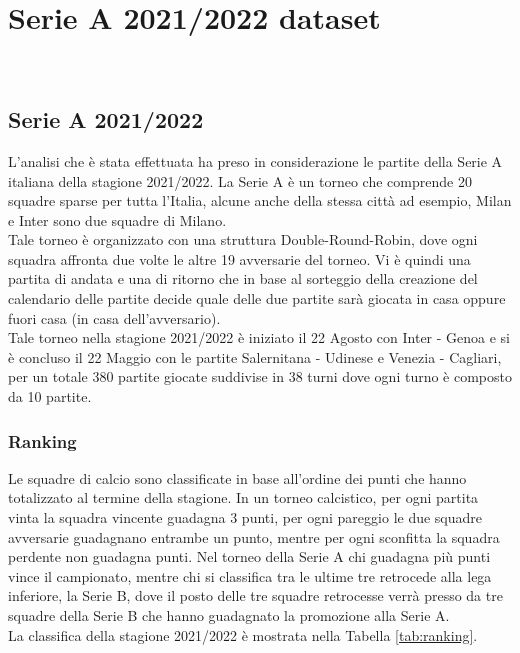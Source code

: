 
\chapter{Serie A 2021/2022 dataset }

\\

\section{Serie A 2021/2022}

L'analisi che è stata effettuata ha preso in considerazione le partite della Serie A italiana della stagione 2021/2022. La Serie A è un torneo che comprende 20 squadre sparse per tutta l'Italia, alcune anche della stessa città ad esempio, Milan e Inter sono due squadre di Milano. \\
Tale torneo è organizzato con una struttura Double-Round-Robin, dove ogni squadra affronta due volte le altre 19 avversarie del torneo. Vi è quindi una partita di andata e una di ritorno che in base al sorteggio della creazione del calendario delle partite decide quale delle due partite sarà giocata in casa oppure fuori casa (in casa dell'avversario). \\
Tale torneo nella stagione 2021/2022 è iniziato il 22 Agosto con Inter - Genoa e si è concluso il 22 Maggio con le partite Salernitana - Udinese e Venezia - Cagliari, per un totale 380 partite giocate suddivise in 38 turni dove ogni turno è composto da 10 partite.

\subsection{Ranking}
Le squadre di calcio sono classificate in base all'ordine dei punti che hanno totalizzato al termine della stagione. In un torneo calcistico, per ogni partita vinta la squadra vincente guadagna 3 punti, per ogni pareggio le due squadre avversarie guadagnano entrambe un punto, mentre per ogni sconfitta la squadra perdente non guadagna punti. Nel torneo della Serie A chi guadagna più punti vince il campionato, mentre chi si classifica tra le ultime tre retrocede alla lega inferiore, la Serie B, dove il posto delle tre squadre retrocesse verrà presso da tre squadre della Serie B che hanno guadagnato la promozione alla Serie A.\\ 
La classifica della stagione 2021/2022 è mostrata nella Tabella \ref{tab:ranking}.


